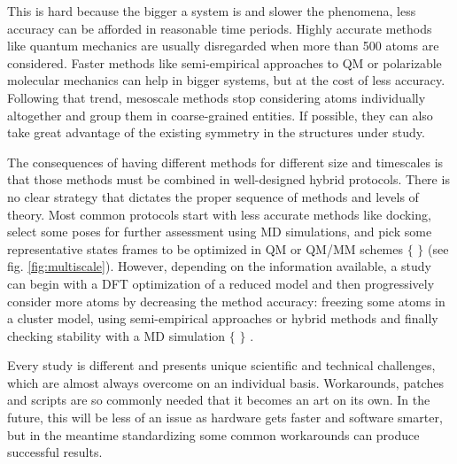 This is hard because the bigger a system is and slower the phenomena, less accuracy can be afforded in reasonable time periods. Highly accurate methods like quantum mechanics are usually disregarded when more than 500 atoms are considered. Faster methods like semi-empirical approaches to QM or polarizable molecular mechanics can help in bigger systems, but at the cost of less accuracy. Following that trend, mesoscale methods stop considering atoms individually altogether and group them in coarse-grained entities. If possible, they can also take great advantage of the existing symmetry in the structures under study.

The consequences of having different methods for different size and timescales is that those methods must be combined in well-designed hybrid protocols. There is no clear strategy that dictates the proper sequence of methods and levels of theory. Most common protocols start with less accurate methods like docking, select some poses for further assessment using MD simulations, and pick some representative states frames to be optimized in QM or QM/MM schemes $ \{ $ $ \} $  (see fig. \ref{fig:multiscale}). However, depending on the information available, a study can begin with a DFT optimization of a reduced model and then progressively consider more atoms by decreasing the method accuracy: freezing some atoms in a cluster model, using semi-empirical approaches or hybrid methods and finally checking stability with a MD simulation $ \{ $ $ \} $ .

Every study is different and presents unique scientific and technical challenges, which are almost always overcome on an individual basis. Workarounds, patches and scripts are so commonly needed that it becomes an art on its own. In the future, this will be less of an issue as hardware gets faster and software smarter, but in the meantime standardizing some common workarounds can produce successful results.






